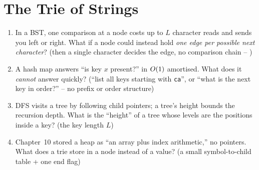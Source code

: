 \section{The Trie of Strings}\label{sec:c08-triebasics}

\begin{previouslybox}
\begin{enumerate}[nosep, leftmargin=1.6em]
  \item In a BST, one comparison at a node costs up to $L$ character reads and sends you left or right.
        What if a node could instead hold \emph{one edge per possible next character}? (then a single
        character decides the edge, no comparison chain -- )
  \item A hash map answers ``is key $x$ present?'' in $O(1)$ amortised. What does it \emph{cannot}
        answer quickly? (``list all keys starting with \texttt{ca}'', or ``what is the next key in
        order?'' -- no prefix or order structure)
  \item DFS visits a tree by following child pointers; a tree's height bounds the recursion depth. What
        is the ``height'' of a tree whose levels are the positions inside a key? (the key length $L$)
  \item Chapter~10 stored a heap as ``an array plus index arithmetic,'' no pointers. What does a trie
        store in a node instead of a value? (a small symbol-to-child table + one end flag)
\end{enumerate}
\end{previouslybox}


